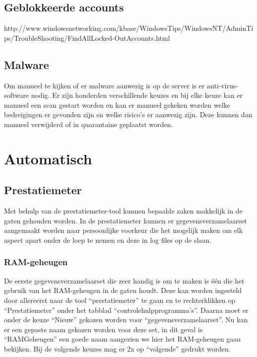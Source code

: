 \documentclass[pdftex,a4paper,12pt]{report}
\begin{document}
\subsection{Geblokkeerde accounts}
http://www.windowsnetworking.com/kbase/WindowsTips/WindowsNT/AdminTips/TroubleShooting/FindAllLocked-OutAccounts.html

\subsection{Malware}
Om manueel te kijken of er malware aanwezig is op de server is er anti-virus-software nodig. Er zijn honderden verschillende keuzes en bij elke keuze kan er manueel een scan gestart worden en kan er manueel gekeken worden welke bedreigingen er gevonden zijn en welke risico's er aanwezig zijn. Deze kunnen dan manueel verwijderd of in quarantaine geplaatst worden. 

\section{Automatisch}
\subsection{Prestatiemeter}
Met behulp van de prestatiemeter-tool kunnen bepaalde zaken makkelijk in de gaten gehouden worden. In de prestatiemeter kunnen er gegevensverzamelaarset aangemaakt worden naar persoonlijke voorkeur die het mogelijk maken om elk aspect apart onder de loep te nemen en deze in log files op de slaan.

\subsubsection{RAM-geheugen}
De eerste gegevensverzamelaarset die zeer handig is om te maken is één die het gebruik van het RAM-geheugen in de gaten houdt. Deze kan worden ingesteld door allereerst naar de tool "`prestatiemeter"' te gaan en te rechterklikken op "`Prestatiemeter"' onder het tabblad "`controlehulpprogramma's"'. Daarna moet er onder de keuze "`Nieuw"' gekozen worden voor "`gegevensverzamelaarset"'. Nu kan er een gepaste naam gekozen worden voor deze set, in dit geval is "`RAMGeheugen"' een goede naam aangezien we hier het RAM-geheugen gaan bekijken. Bij de volgende keuzes mag er 2x op "`volgende"' gedrukt worden. \newline
\end{document}
